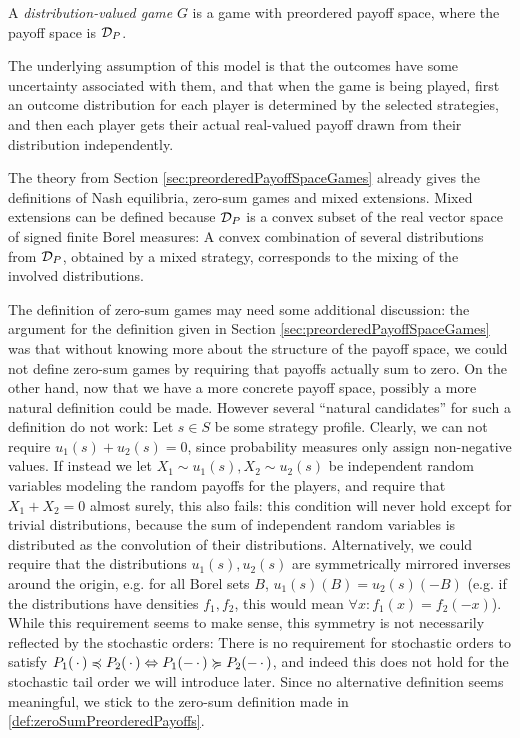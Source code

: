 \documentclass[a4paper]{scrreprt}
\begin{document}
    \begin{defn}
        A \emph{distribution-valued game} $G$ is a game with preordered payoff space, where the payoff space is $\mathcal{D}_P$.
    \end{defn}
    The underlying assumption of this model is that the outcomes have some uncertainty associated with them, and that when the game is being played, first an outcome distribution for each player is determined by the selected strategies, and then each player gets their actual real-valued payoff drawn from their distribution independently.

    The theory from Section \ref{sec:preorderedPayoffSpaceGames} already gives the definitions of Nash equilibria, zero-sum games and mixed extensions. 
    Mixed extensions can be defined because $\mathcal{D}_P$ is a convex subset of the real vector space of signed finite Borel measures: A convex combination of several distributions from $\mathcal{D}_P$, obtained by a mixed strategy, corresponds to the mixing of the involved distributions.
    
    The definition of zero-sum games may need some additional discussion: the argument for the definition given in Section \ref{sec:preorderedPayoffSpaceGames} was that without knowing more about the structure of the payoff space, we could not define zero-sum games by requiring that payoffs actually sum to zero.
    On the other hand, now that we have a more concrete payoff space, possibly a more natural definition could be made.    
    However several “natural candidates” for such a definition do not work: Let $s \in S$ be some strategy profile.
    Clearly, we can not require $u_1(s) + u_2(s) = 0$, since probability measures only assign non-negative values.
    If instead we let $X_1 \sim u_1(s), X_2 \sim u_2(s)$ be independent random variables modeling the random payoffs for the players, and require that $X_1 + X_2 = 0$ almost surely, this also fails: this condition will never hold except for trivial distributions, because the sum of independent random variables is distributed as the convolution of their distributions.
    Alternatively, we could require that the distributions $u_1(s), u_2(s)$ are symmetrically mirrored inverses around the origin, e.g. for all Borel sets $B$, $u_1(s)(B) = u_2(s)(-B)$ (e.g. 
    if the distributions have densities $f_1, f_2$, this would mean $\forall x: f_1(x) = f_2(-x)$).
    While this requirement seems to make sense, this symmetry is not necessarily reflected by the stochastic orders: There is no requirement for stochastic orders to satisfy $P_1(\,\cdot\,) \preccurlyeq P_2(\,\cdot\,) \Leftrightarrow P_1(-\,\cdot\,) \succcurlyeq P_2(-\,\cdot\,)$, and indeed this does not hold for the stochastic tail order we will introduce later.
    Since no alternative definition seems meaningful, we stick to the zero-sum definition made in \ref{def:zeroSumPreorderedPayoffs}.
\end{document}
